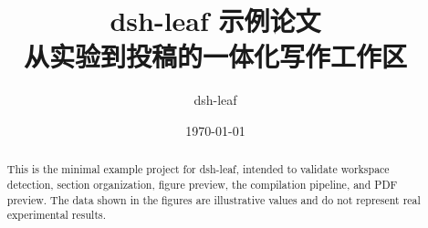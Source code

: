 \documentclass[11pt,a4paper]{article}
\title{dsh-leaf 示例论文\\\large 从实验到投稿的一体化写作工作区}
\author{dsh-leaf}
\date{\today}
\begin{document}
\maketitle

\begin{abstract}
This is the minimal example project for dsh-leaf, intended to validate workspace detection, section organization, figure preview, the compilation pipeline, and PDF preview. The data shown in the figures are illustrative values and do not represent real experimental results.
\end{abstract}






\end{document}
